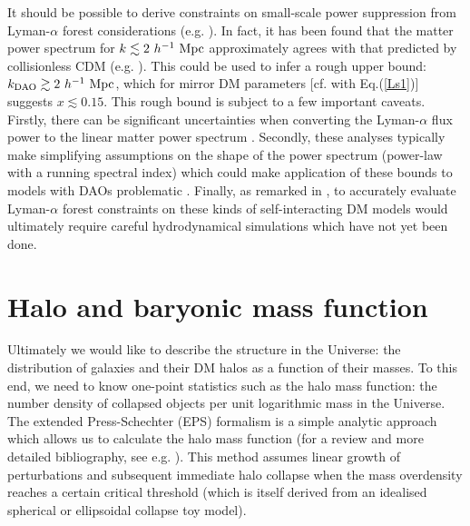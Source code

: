 \documentclass[12pt]{article}
\begin{document}
It should be possible to derive constraints on small-scale power suppression from Lyman-$\alpha$ forest considerations (e.g.  \cite{lf1,lf2,seljak}). 
In fact, it has been found that the matter power spectrum for 
$k \lesssim 2 \ h^{-1} \ \rm Mpc$ approximately agrees with that predicted by collisionless CDM (e.g. \cite{seljak}). 
This could be used to infer a rough upper bound:  $k_{\text{DAO}} \gtrsim 2 \ h^{-1} \ \rm Mpc$, which  
for mirror DM parameters [cf. with Eq.(\ref{Ls1})] suggests $x \lesssim 0.15$. This rough bound is subject to a few 
important caveats.  Firstly, there can be significant uncertainties when converting 
the Lyman-$\alpha$ flux power to the linear matter power spectrum \cite{peiris}. Secondly, these analyses typically make 
simplifying assumptions on the shape of the power spectrum (power-law with a running spectral index)  
which could make application of these bounds to models with DAOs problematic \cite{cyr2}.  
Finally, as remarked in \cite{sigurdson4}, to accurately evaluate Lyman-$\alpha$ 
forest constraints on these kinds of self-interacting DM models would ultimately require careful hydrodynamical 
simulations which have not yet been done. 


\section{Halo and baryonic mass function}
\label{halo}

Ultimately we would like to describe the structure in the Universe: the distribution of galaxies and their DM halos as a function of their 
masses. To this end, we need to know one-point statistics such as the halo mass function: the number density of collapsed objects per 
unit logarithmic mass in the Universe. 
The extended Press-Schechter (EPS) formalism \cite{ps,Bond} 
is a simple analytic approach which allows us to calculate the halo mass function 
(for a review and more detailed bibliography, see e.g. \cite{psreview}). 
This method assumes linear growth of perturbations and subsequent immediate halo collapse when the mass overdensity reaches a certain 
critical threshold (which is itself derived from an idealised spherical or ellipsoidal collapse toy model).
\end{document}
